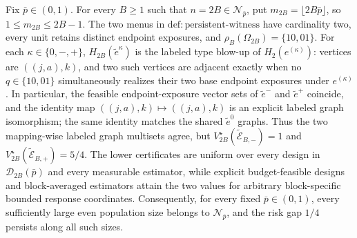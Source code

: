 Fix \(\bar p\in(0,1)\). For every \(B\ge1\) such that \(n=2B\in\mathcal N_{\bar p}\), put \(m_{2B}=\lfloor2B\bar p\rfloor\), so \(1\le m_{2B}\le2B-1\). The two menus in \(\mathrm{def{:}persistent\text{-}witness}\) have cardinality two, every unit retains distinct endpoint exposures, and \(\rho_B(\Omega_{2B})=\{10,01\}\). For each \(\kappa\in\{0,-,+\}\), \(H_{2B}(\widetilde e^\kappa)\) is the labeled type blow-up of \(H_2(e^{(\kappa)})\): vertices are \(((j,a),k)\), and two such vertices are adjacent exactly when no \(q\in\{10,01\}\) simultaneously realizes their two base endpoint exposures under \(e^{(\kappa)}\). In particular, the feasible endpoint-exposure vector sets of \(\widetilde e^-\) and \(\widetilde e^+\) coincide, and the identity map \(((j,a),k)\mapsto((j,a),k)\) is an explicit labeled graph isomorphism; the same identity matches the shared \(\widetilde e^0\) graphs. Thus the two mapping-wise labeled graph multisets agree, but \(V_{2B}^\star(\widetilde{\mathcal E}_{B,-})=1\) and \(V_{2B}^\star(\widetilde{\mathcal E}_{B,+})=5/4\). The lower certificates are uniform over every design in \(\mathcal D_{2B}(\bar p)\) and every measurable estimator, while explicit budget-feasible designs and block-averaged estimators attain the two values for arbitrary block-specific bounded response coordinates. Consequently, for every fixed \(\bar p\in(0,1)\), every sufficiently large even population size belongs to \(\mathcal N_{\bar p}\), and the risk gap \(1/4\) persists along all such sizes.